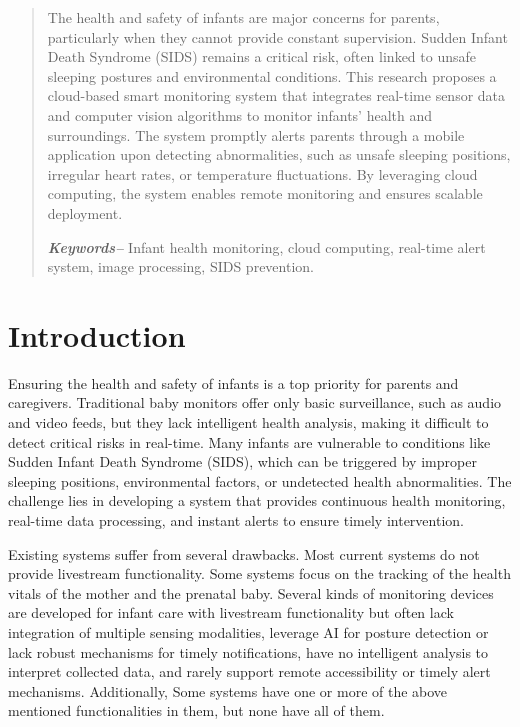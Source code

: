 \documentclass[conference]{IEEEtran}
\begin{document}
\begin{abstract}
    The health and safety of infants are major concerns for parents, particularly when they cannot provide constant supervision. Sudden Infant Death Syndrome (SIDS) remains a critical risk, often linked to unsafe sleeping postures and environmental conditions. This research proposes a cloud-based smart monitoring system that integrates real-time sensor data and computer vision algorithms to monitor infants’ health and surroundings. The system promptly alerts parents through a mobile application upon detecting abnormalities, such as unsafe sleeping positions, irregular heart rates, or temperature fluctuations. By leveraging cloud computing, the system enables remote monitoring and ensures scalable deployment.
    
    \textit{\textbf{Keywords--}}
    Infant health monitoring, cloud computing, real-time alert system, image processing, SIDS prevention.
\end{abstract}

    
    \section{Introduction}
    Ensuring the health and safety of infants is a top priority for parents and caregivers. Traditional baby monitors offer only basic surveillance, such as audio and video feeds, but they lack intelligent health analysis, making it difficult to detect critical risks in real-time. Many infants are vulnerable to conditions like Sudden Infant Death Syndrome (SIDS), which can be triggered by improper sleeping positions, environmental factors, or undetected health abnormalities. The challenge lies in developing a system that provides continuous health monitoring, real-time data processing, and instant alerts to ensure timely intervention.

    Existing systems suffer from several drawbacks. Most current systems do not provide livestream functionality\cite{ref1}\cite{ref2}. Some systems focus on the tracking of the health vitals of the mother and the prenatal baby\cite{ref3}. Several kinds of monitoring devices are developed for infant care with livestream functionality but often lack integration of multiple sensing modalities, leverage AI for posture detection or lack robust mechanisms for timely notifications, have no intelligent analysis to interpret collected data, and rarely support remote accessibility or timely alert mechanisms\cite{ref4}. Additionally, Some systems have one or more of the above mentioned functionalities in them, but none have all of them\cite{ref5}. 
    
\end{document}
